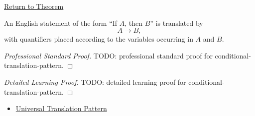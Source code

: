 \newpage
{}
\label{prf:conditional-translation-pattern}

\begin{remark*}[Return]
\hyperref[prop:conditional-translation-pattern]{Return to Theorem}
\end{remark*}

\begin{theorem*}
An English statement of the form ``If \(A\), then \(B\)'' is translated by
\[
A\to B,
\]
with quantifiers placed according to the variables occurring in \(A\) and \(B\).
\end{theorem*}

\begin{proof}[Professional Standard Proof]
\LRAProofBodyStart
TODO: professional standard proof for conditional-translation-pattern.
\end{proof}

\begin{proof}[Detailed Learning Proof]
\LRAProofBodyStart
TODO: detailed learning proof for conditional-translation-pattern.
\end{proof}

\begin{remark*}
\end{remark*}

\begin{dependencies}
\begin{itemize}
  \item \hyperref[prop:universal-translation-pattern]{Universal Translation Pattern}
\end{itemize}
\end{dependencies}

\clearpage
